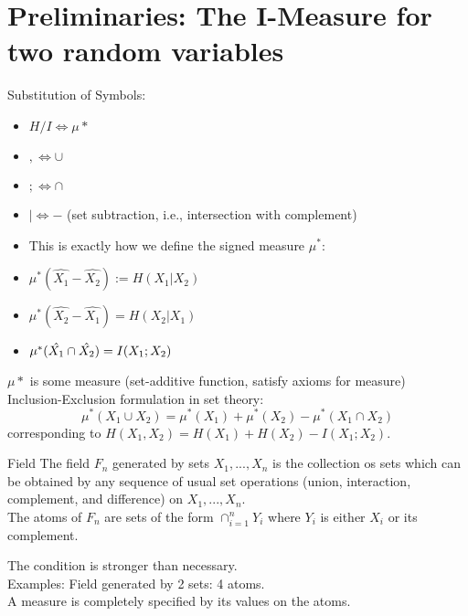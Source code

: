 \documentclass[../main.tex]{subfiles}
\begin{document}
\section*{Preliminaries: The I-Measure for two random variables}
Substitution of Symbols:\begin{itemize}
    \item $H/I \iff \mu*$
    \item $, \iff \cup$
    \item $; \iff \cap$
    \item $| \iff -$ (set subtraction, i.e., intersection with complement)
    \item This is exactly how we define the signed measure $\mu^*$:
    \item $\mu^*(\hat{X_1}-\hat{X_2}):=H(X_1|X_2)$
    \item $\mu^*(\hat{X_2}-\hat{X_1})=H(X_2|X_1)$
    \item $\mu^*(\hat{X_1}\cap \hat{X_2})=I(X_1;X_2)$
\end{itemize}
$\mu*$ is some measure (set-additive function, satisfy axioms for measure)\\
Inclusion-Exclusion formulation in set theory: \begin{equation*}
    \mu^*(X_1\cup X_2)=\mu^*(X_1)+\mu^*(X_2)-\mu^*(X_1\cap X_2)
\end{equation*} corresponding to $H(X_1,X_2)=H(X_1)+H(X_2)-I(X_1;X_2)$.
\begin{gbox}{Field}
    The field $F_n$ generated by sets $X_1,...,X_n$ is the collection os sets which can be obtained by any sequence of usual set operations (union, interaction, complement, and difference) on $X_1,...,X_n$.\\
    The atoms of $F_n$ are sets of the form $\cap_{i=1}^n Y_i$ where $Y_i$ is either $X_i$ or its complement.
\end{gbox}
The condition is stronger than necessary.\\
Examples: Field generated by 2 sets: 4 atoms.\\
A measure is completely specified by its values on the atoms.
\end{document}
